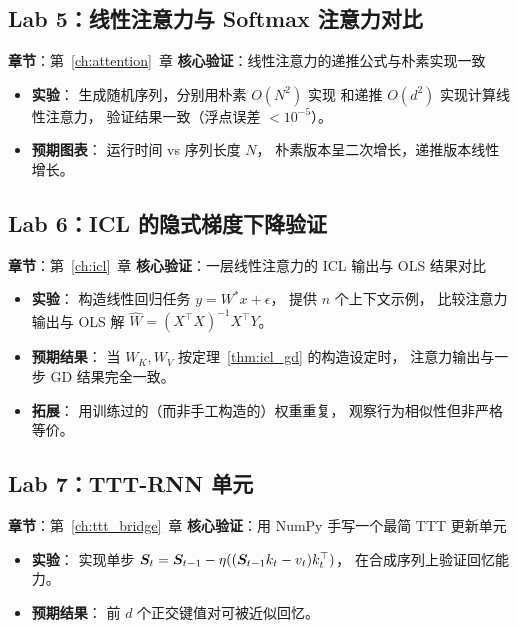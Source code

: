 \subsection{Lab 5：线性注意力与 Softmax 注意力对比}

\textbf{章节}：第~\ref{ch:attention}~章 \quad
\textbf{核心验证}：线性注意力的递推公式与朴素实现一致

\begin{itemize}
  \item \textbf{实验}：
    生成随机序列，分别用朴素 $O(N^2)$ 实现
    和递推 $O(d^2)$ 实现计算线性注意力，
    验证结果一致（浮点误差 $< 10^{-5}$）。

  \item \textbf{预期图表}：
    运行时间 vs 序列长度 $N$，
    朴素版本呈二次增长，递推版本线性增长。
\end{itemize}

\subsection{Lab 6：ICL 的隐式梯度下降验证}

\textbf{章节}：第~\ref{ch:icl}~章 \quad
\textbf{核心验证}：一层线性注意力的 ICL 输出与 OLS 结果对比

\begin{itemize}
  \item \textbf{实验}：
    构造线性回归任务 $y = W^* x + \epsilon$，
    提供 $n$ 个上下文示例，
    比较注意力输出与 OLS 解 $\hat{W} = (X^\top X)^{-1} X^\top Y$。

  \item \textbf{预期结果}：
    当 $W_K, W_V$ 按定理~\ref{thm:icl_gd} 的构造设定时，
    注意力输出与一步 GD 结果完全一致。

  \item \textbf{拓展}：
    用训练过的（而非手工构造的）权重重复，
    观察行为相似性但非严格等价。
\end{itemize}

\subsection{Lab 7：TTT-RNN 单元}

\textbf{章节}：第~\ref{ch:ttt_bridge}~章 \quad
\textbf{核心验证}：用 NumPy 手写一个最简 TTT 更新单元

\begin{itemize}
  \item \textbf{实验}：
    实现单步 $\boldsymbol{S}_t = \boldsymbol{S}_{t-1} - \eta ((\boldsymbol{S}_{t-1} k_t - v_t) k_t^\top)$，
    在合成序列上验证回忆能力。

  \item \textbf{预期结果}：
    前 $d$ 个正交键值对可被近似回忆。
\end{itemize}

